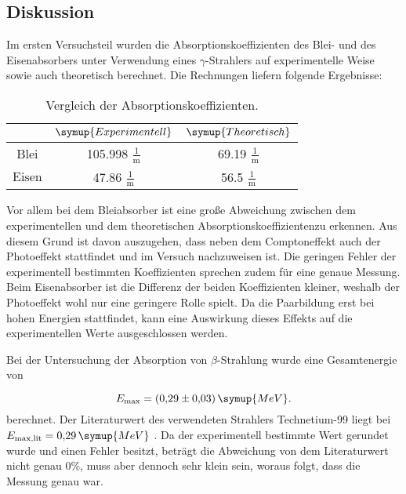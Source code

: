 \subsection{Diskussion}

Im ersten Versuchsteil wurden die Absorptionskoeffizienten des Blei- und des Eisenabsorbers unter Verwendung eines $\gamma$-Strahlers auf experimentelle Weise sowie auch theoretisch berechnet. Die Rechnungen liefern folgende Ergebnisse:

\begin{table}[htbp]
\centering
\caption{Vergleich der Absorptionskoeffizienten.}
\label{tab:litwerte}
\begin{tabular}{S S[table-auto-round, table-format=3.3] S[table-auto-round, table-format=2.2]}
\toprule
& {$\symup{Experimentell}$} & {$\symup{Theoretisch}$} \\
\midrule
$\text{Blei}$  & 105.998 $\frac{1}{\text{m}}$ & 69.19 $\frac{1}{\text{m}}$ \\
$\text{Eisen}$ & 47.86 $\frac{1}{\text{m}}$ & 56.5 $\frac{1}{\text{m}}$ \\

\bottomrule
\end{tabular}
\end{table}
Vor allem bei dem Bleiabsorber ist eine große Abweichung zwischen dem experimentellen und dem theoretischen Absorptionskoeffizientenzu erkennen. Aus diesem Grund ist davon auszugehen, dass neben dem Comptoneffekt auch der Photoeffekt 
stattfindet und im Versuch nachzuweisen ist. Die geringen Fehler der experimentell bestimmten Koeffizienten sprechen zudem für eine genaue Messung. Beim Eisenabsorber ist die Differenz der beiden Koeffizienten kleiner, weshalb der 
Photoeffekt wohl nur eine geringere Rolle spielt. Da die Paarbildung erst bei hohen Energien stattfindet, kann eine Auswirkung dieses Effekts auf die experimentellen Werte ausgeschlossen werden.

Bei der Untersuchung der Absorption von $\beta$-Strahlung wurde eine Gesamtenergie von

\begin{equation*}
E_{\text{max}} = (0{,}29 \pm 0{,}03)\,\symup{MeV}.
\end{equation*}
berechnet. Der Literaturwert des verwendeten Strahlers Technetium-99 liegt bei $E_{\text{max,lit}} = 0{,}29\,\symup{MeV}$ \cite{wiki}. Da der experimentell bestimmte Wert gerundet wurde und einen Fehler besitzt, beträgt die Abweichung von dem Literaturwert 
nicht genau 0\%, muss aber dennoch sehr klein sein, woraus folgt, dass die Messung genau war.